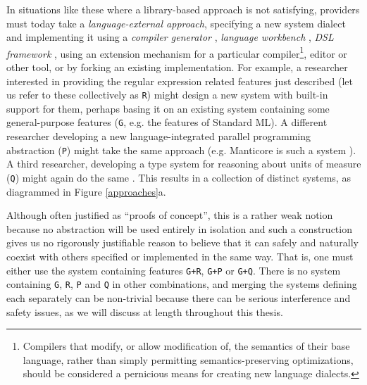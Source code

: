 In situations like these where a library-based approach is not satisfying, providers must today take a \emph{language-external approach}, specifying a new system dialect and implementing it using a \emph{compiler generator} \cite{brooker1963compiler}, \emph{language workbench} \cite{erdweg2013state}, \emph{DSL framework} \cite{fowler2010domain}, using an extension mechanism for a {particular} compiler\footnote{Compilers that modify, or allow modification of, the semantics of their base language, rather than simply permitting semantics-preserving optimizations, should be considered a pernicious means for creating new language dialects. 
}, editor or other tool, or by forking an existing implementation. For example, a researcher interested in providing the regular expression related features just described (let us refer to these collectively as \texttt{R}) might design a new system with built-in support for them, perhaps basing it on an existing system containing some general-purpose features (\texttt{G}, e.g. the features of Standard ML). A different researcher developing a new language-integrated parallel programming abstraction (\texttt{P}) might  take the same approach (e.g. Manticore is such a system \cite{conf/popl/FluetRRSX07}). A third researcher, developing a type system for reasoning about units of measure (\texttt{Q}) might again do the same \cite{conf/cefp/Kennedy09}. This results in a collection of distinct  systems, as diagrammed in Figure \ref{approaches}a. 

Although often justified as ``proofs of concept'', this is a rather weak notion because no abstraction will be used entirely in isolation and such a construction gives us no rigorously justifiable  reason to believe that it can safely and naturally coexist with others specified or implemented in the same way. That is, one must either use the system containing features \texttt{G+R}, \texttt{G+P} or \texttt{G+Q}. There is no system containing \texttt{G}, \texttt{R}, \texttt{P} and \texttt{Q} in other combinations, and merging the systems defining each separately can be non-trivial because there can be serious interference and safety issues, as we will discuss at length throughout this thesis.

